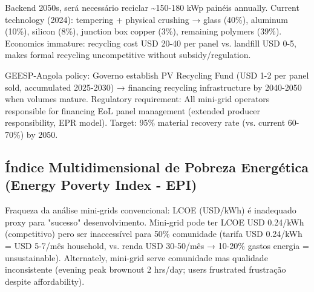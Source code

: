 \documentclass[12pt, a4paper]{article}
\begin{document}
Backend 2050s, será necessário reciclar \textasciitilde{}150-180 kWp painéis annually. Current technology (2024): tempering + physical crushing → glass (40\%), aluminum (10\%), silicon (8\%), junction box copper (3\%), remaining polymers (39\%). Economics immature: recycling cost USD 20-40 per panel vs. landfill USD 0-5, makes formal recycling uncompetitive without subsidy/regulation.

GEESP-Angola policy: Governo establish PV Recycling Fund (USD 1-2 per panel sold, accumulated 2025-2030) → financing recycling infrastructure by 2040-2050 when volumes mature. Regulatory requirement: All mini-grid operators responsible for financing EoL panel management (extended producer responsibility, EPR model). Target: 95\% material recovery rate (vs. current 60-70\%) by 2050.

\subsection{Índice Multidimensional de Pobreza Energética (Energy Poverty Index - EPI)}

Fraqueza da análise mini-grids convencional: LCOE (USD/kWh) é inadequado proxy para "sucesso" desenvolvimento. Mini-grid pode ter LCOE USD 0.24/kWh (competitivo) pero ser inaccessível para 50\% comunidade (tarifa USD 0.24/kWh = USD 5-7/mês household, vs. renda USD 30-50/mês → 10-20\% gastos energia = unsustainable). Alternately, mini-grid serve comunidade mas qualidade inconsistente (evening peak brownout 2 hrs/day; users frustrated frustração despite affordability).
\end{document}
